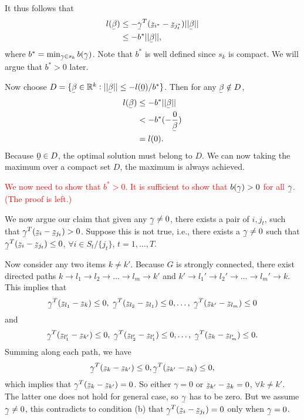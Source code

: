 \documentclass[11pt]{article}
\newcommand{\ubar}[1]{\underaccent{\bar}{#1}}
\begin{document}
It thus follows that 
\begin{align*}
l(\ubar \beta)&\leq -\ubar \gamma^T(\ubar z_{i^*}-\ubar z_{j^*_t})||\ubar \beta||\\
&\leq -b^*||\ubar \beta||,
\end{align*}
where $b^*=\min_{\ubar \gamma \in s_k}b(\ubar \gamma)$. Note that $b^*$ is well defined since $s_k$ is compact. We will argue that $b^*>0$ later.

Now choose $D=\{\ubar \beta\in \mathbb{R}^k:||\ubar \beta||\leq -l(\ubar 0)/b^*\}$. Then for any $\ubar \beta \notin D$,
\begin{align*}
l(\ubar \beta)&\leq -b^*||\ubar \beta||\\
&<-b^*(-\frac{0}{\ubar \beta})\\
&=l(0).
\end{align*}
Because $\ubar 0\in D$, the optimal solution must belong to $D$. We can now taking the maximum over a compact set $D$, the maximum is always achieved.

\textcolor{red}{We now need to show that $b^*>0$. It is sufficient to show that $b(\ubar \gamma)>0$ for all $\ubar \gamma$. (The proof is left.)}

 We now argue our claim that given any $\ubar \gamma \neq 0$, there exists a pair of $i,j_t$, such that $\ubar \gamma^T(\ubar z_i-\ubar z_{j_t})>0$. Suppose this is not true, i.e., there exists a $\ubar \gamma \neq 0$ such that $\ubar \gamma^T(\ubar z_i-\ubar z_{j_t})\leq 0$, $\forall i \in S_t/\{j_t\}$, $t=1,\ldots,T$.
 
 Now consider any two items $k\neq k'$. Because $G$ is strongly connected, there exist directed paths $k \rightarrow l_1\rightarrow l_2\rightarrow \ldots \rightarrow l_m\rightarrow k'$ and $k'\rightarrow l_1' \rightarrow l_2' \rightarrow \ldots \rightarrow l_m' \rightarrow k$. This implies that
 $$\ubar \gamma ^T(\ubar z_{l_1}-\ubar z_k)\leq 0, \ \ubar \gamma ^T(\ubar z_{l_2}-\ubar z_{l_1})\leq 0, \ldots, \ \ubar \gamma ^T(\ubar z_{k'}-\ubar z_{l_m})\leq 0$$
 and
 $$\ubar \gamma ^T(\ubar z_{l_1'}-\ubar z_{k'})\leq 0, \ \ubar \gamma ^T(\ubar z_{l_2'}-\ubar z_{l_1'})\leq 0, \ldots, \ \ubar \gamma ^T(\ubar z_{k}-\ubar z_{l_m'})\leq 0.$$
 Summing along each path, we have
 $$ \ubar \gamma ^T(\ubar z_{k}-\ubar z_{k'})\leq 0,  \ubar \gamma ^T(\ubar z_{k'}-\ubar z_{k})\leq 0,$$
 which implies that $ \ubar \gamma ^T(\ubar z_{k}-\ubar z_{k'})=0$. So either $\gamma=0$ or $\ubar z_{k'}-\ubar z_k=0$, $\forall k\neq k'$. The latter one does not hold for general case, so $\ubar \gamma$ has to be zero. But we assume $\ubar \gamma \neq 0$, this contradicts to condition (b) that $\ubar \gamma^T(\ubar z_i -\ubar z_{j_t})=0$ only when $\ubar \gamma=0$.  \\
 
\end{document}
